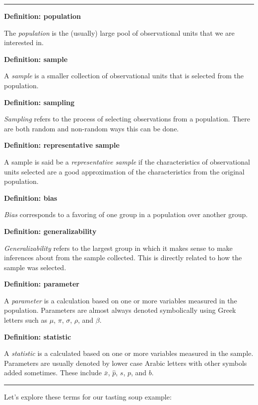 \documentclass[]{tufte-book}
\begin{document}
\begin{center}\rule{\linewidth}{\linethickness}\end{center}

\textbf{Definition: population}

The \emph{population} is the (usually) large pool of observational units
that we are interested in.

\textbf{Definition: sample}

A \emph{sample} is a smaller collection of observational units that is
selected from the population.

\textbf{Definition: sampling}

\emph{Sampling} refers to the process of selecting observations from a
population. There are both random and non-random ways this can be done.

\textbf{Definition: representative sample}

A sample is said be a \emph{representative sample} if the
characteristics of observational units selected are a good approximation
of the characteristics from the original population.

\textbf{Definition: bias}

\emph{Bias} corresponds to a favoring of one group in a population over
another group.

\textbf{Definition: generalizability}

\emph{Generalizability} refers to the largest group in which it makes
sense to make inferences about from the sample collected. This is
directly related to how the sample was selected.

\textbf{Definition: parameter}

A \emph{parameter} is a calculation based on one or more variables
measured in the population. Parameters are almost always denoted
symbolically using Greek letters such as \(\mu\), \(\pi\), \(\sigma\),
\(\rho\), and \(\beta\).

\textbf{Definition: statistic}

A \emph{statistic} is a calculated based on one or more variables
measured in the sample. Parameters are usually denoted by lower case
Arabic letters with other symbols added sometimes. These include
\(\bar{x}\), \(\hat{p}\), \(s\), \(p\), and \(b\).

\begin{center}\rule{\linewidth}{\linethickness}\end{center}

Let's explore these terms for our tasting soup example:
\end{document}
